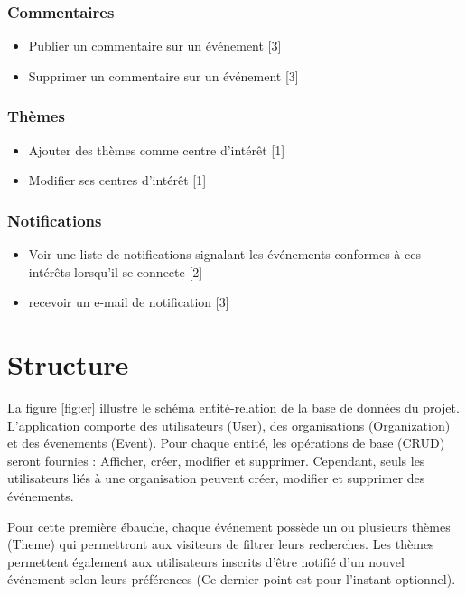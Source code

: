 \documentclass[11pt, a4paper, french, twoside]{article}
\begin{document}
			\subsubsection{Commentaires}
			\label{subsubsec:commentaires}
			
				\begin{itemize}
					\item Publier un commentaire sur un événement [3]
					\item Supprimer un commentaire sur un événement [3]
				\end{itemize}
			
			
			\subsubsection{Thèmes}
			\label{subsubsec:themes}
			
			\begin{itemize}
				\item Ajouter des thèmes comme centre d'intérêt [1]
				\item Modifier ses centres d'intérêt [1]
			\end{itemize}
		
			\subsubsection{Notifications}
			\label{subsubsec:notifications}
			
				\begin{itemize}
					\item Voir une liste de notifications signalant les événements conformes à ces intérêts lorsqu'il se connecte [2]
					\item recevoir un e-mail de notification [3] 
				\end{itemize}
		
	\section{Structure}
	\label{sec:structure}
		La figure \ref{fig:er} illustre le schéma entité-relation de la base de données du projet. L'application comporte des utilisateurs (User), des organisations (Organization) et des évenements (Event). Pour chaque entité, les opérations de base (CRUD) seront fournies : Afficher, créer, modifier et supprimer. Cependant, seuls les utilisateurs liés à une organisation peuvent créer, modifier et supprimer des événements.
		
		Pour cette première ébauche, chaque événement possède un ou plusieurs thèmes (Theme) qui permettront aux visiteurs de filtrer leurs recherches. Les thèmes permettent également aux utilisateurs inscrits d'être notifié d'un nouvel événement selon leurs préférences (Ce dernier point est pour l'instant optionnel).
		
\end{document}

